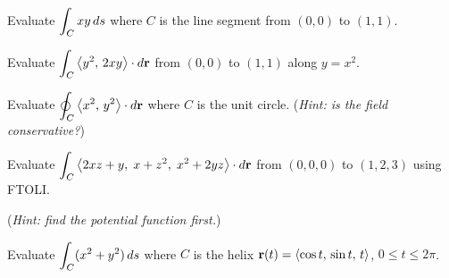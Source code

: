 \documentclass[11pt]{article}
\begin{document}
\begin{practice}

\prob
Evaluate $\displaystyle\int_C xy\,ds$ where $C$ is the line segment from $(0,0)$ to $(1,1)$.


\vspace{3cm}

\prob
Evaluate $\displaystyle\int_C \left\langle y^2,\, 2xy \right\rangle\cdot d\mathbf{r}$ from $(0,0)$ to $(1,1)$ along $y = x^2$.


\vspace{3.5cm}

\prob
Evaluate $\displaystyle\oint_C \left\langle x^2,\, y^2 \right\rangle\cdot d\mathbf{r}$ where $C$ is the unit circle. (\textit{Hint: is the field conservative?})


\vspace{2.5cm}

\prob
Evaluate $\displaystyle\int_C \left\langle 2xz + y,\; x + z^2,\; x^2 + 2yz \right\rangle\cdot d\mathbf{r}$ from $(0,0,0)$ to $(1,2,3)$ using FTOLI.

(\textit{Hint: find the potential function first.})


\vspace{4cm}

\prob
Evaluate $\displaystyle\int_C (x^2 + y^2)\,ds$ where $C$ is the helix $\mathbf{r}(t) = \left\langle \cos t,\, \sin t,\, t \right\rangle$, $0 \le t \le 2\pi$.


\vspace{3cm}

\end{practice}
\end{document}

